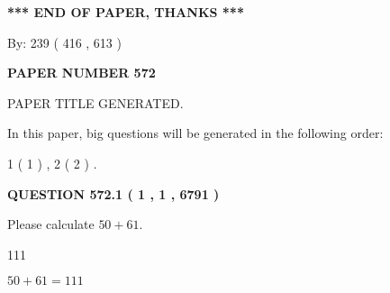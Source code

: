 \documentclass[12pt]{article}
\begin{document}
   
\vspace{1.0in} 
{\textbf{\large{ *** END OF PAPER, THANKS *** }}} 
   
   
\hspace{1.0in} By: 
 239 ( 416 ,  613 )
   
   
   
   
\newpage 
\setcounter{page}{ 
   572001 } 
   
   
   
   
 {\textbf{ \Large{ PAPER NUMBER  572  }}}
   
   
\vspace{0.2in}
   
   
   
   
   
   
   
   
 \vspace{0.2in}
 
 
 
 
   
   
 PAPER TITLE GENERATED.
   
   
   
\vspace{0.2in}
   
In this paper, big questions will be generated in the following order: 
   
   
   1 ( 1 )
 ,
   2 ( 2 )
 .
  
\vspace{0.2in}
  
{\textbf{\Large{QUESTION
572.1 
 ( 1 , 1 , 6791 )
}}}
  
  
 
Please calculate $ %
50 +  %
61 $.
 
 
 
\noindent{}
 
 

111
 
 
\noindent{}
 
 

 
 
 
\noindent{}
 
 

$ %
50 +  %
61=   %
111$
 
\end{document}
